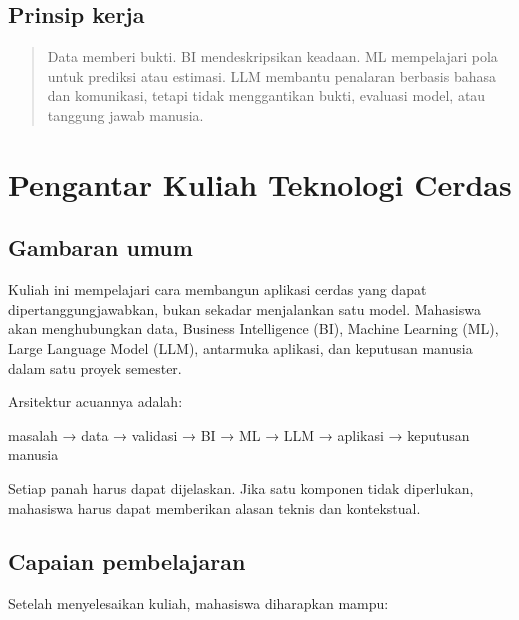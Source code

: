 \documentclass[
  indonesian,
  letterpaper,
  DIV=11,
  numbers=noendperiod]{scrreprt}
\newenvironment{Shaded}{\begin{snugshade}}{\end{snugshade}}
\newcommand{\NormalTok}[1]{\textcolor[rgb]{0.00,0.23,0.31}{#1}}
\begin{document}
\section{Prinsip kerja}\label{prinsip-kerja}

\begin{quote}
Data memberi bukti. BI mendeskripsikan keadaan. ML mempelajari pola
untuk prediksi atau estimasi. LLM membantu penalaran berbasis bahasa dan
komunikasi, tetapi tidak menggantikan bukti, evaluasi model, atau
tanggung jawab manusia.
\end{quote}


\chapter{Pengantar Kuliah Teknologi
Cerdas}\label{pengantar-kuliah-teknologi-cerdas}

\section{Gambaran umum}\label{gambaran-umum}

Kuliah ini mempelajari cara membangun aplikasi cerdas yang dapat
dipertanggungjawabkan, bukan sekadar menjalankan satu model. Mahasiswa
akan menghubungkan data, Business Intelligence (BI), Machine Learning
(ML), Large Language Model (LLM), antarmuka aplikasi, dan keputusan
manusia dalam satu proyek semester.

Arsitektur acuannya adalah:

\begin{Shaded}
\begin{Highlighting}[]
\NormalTok{masalah → data → validasi → BI → ML → LLM → aplikasi → keputusan manusia}
\end{Highlighting}
\end{Shaded}

Setiap panah harus dapat dijelaskan. Jika satu komponen tidak
diperlukan, mahasiswa harus dapat memberikan alasan teknis dan
kontekstual.

\section{Capaian pembelajaran}\label{capaian-pembelajaran}

Setelah menyelesaikan kuliah, mahasiswa diharapkan mampu:
\end{document}
